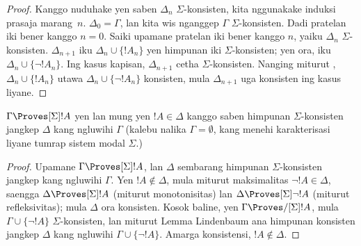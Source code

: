 \documentclass[../../../include/open-logic-section]{subfiles}
\begin{document}
\begin{proof}
Kanggo nuduhake yen saben $\Delta_n$ $\Sigma$-konsisten,
kita nggunakake induksi prasaja marang~$n$. $\Delta_0 = \Gamma$,
lan kita wis nganggep $\Gamma$ $\Sigma$-konsisten. Dadi pratelan iki
bener kanggo $n = 0$. Saiki upamane pratelan iki bener kanggo $n$,
yaiku $\Delta_n$ $\Sigma$-konsisten. $\Delta_{n+1}$ iku
$\Delta_n \cup \{!A_n\}$ yen himpunan iki $\Sigma$-konsisten;
yen ora, iku $\Delta_n \cup \{\lnot!A_n\}$. Ing
kasus kapisan, $\Delta_{n+1}$ cetha $\Sigma$-konsisten. Nanging miturut
,
$\Delta_n \cup \{!A_n\}$ utawa $\Delta_n \cup \{\lnot!A_n\}$
konsisten, mula $\Delta_{n+1}$ uga konsisten ing kasus liyane.
\end{proof}

\begin{cor}
  $\Gamma \Proves[\Sigma] !A$ yen lan mung yen $!A \in \Delta$ kanggo
  saben himpunan $\Sigma$-konsisten jangkep $\Delta$ kang ngluwihi $\Gamma$
  (kalebu nalika $\Gamma = \emptyset$, kang menehi karakterisasi liyane
  tumrap sistem modal $\Sigma$.)
\end{cor}

\begin{proof}
  Upamane $\Gamma \Proves[\Sigma] !A$, lan $\Delta$ sembarang himpunan
  $\Sigma$-konsisten jangkep kang ngluwihi $\Gamma$. Yen $!A
  \notin \Delta$, mula miturut maksimalitas $\lnot!A \in \Delta$, saengga
  $\Delta \Proves[\Sigma] !A$ (miturut monotonisitas) lan $\Delta
  \Proves[\Sigma] \lnot!A$ (miturut refleksivitas); mula $\Delta$
  ora konsisten. Kosok baline, yen $\Gamma \Proves/[\Sigma] !A$, mula
  $\Gamma \cup \{ \lnot!A\}$ $\Sigma$-konsisten, lan miturut
  Lemma Lindenbaum ana himpunan konsisten jangkep $\Delta$
  kang ngluwihi $\Gamma \cup \{ \lnot!A \}$. Amarga konsistensi, $!A
  \notin \Delta$.
\end{proof}
\end{document}
